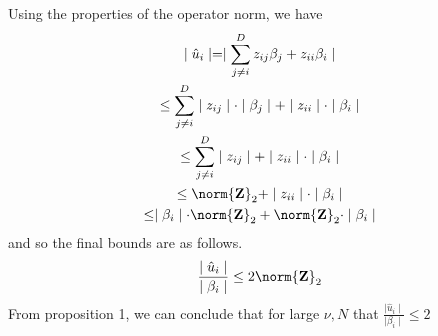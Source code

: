             Using the properties of the operator norm, we have
            \begin{gather*}
                \mid \hat{u}_i \mid = \mid \sum_{j\neq i}^D z_{ij} \beta_j + z_{ii} \beta_i \mid \\
                \leq \sum_{j\neq i}^D \mid z_{ij}\mid \cdot  \mid \beta_j \mid + \mid z_{ii} \mid \cdot \mid \beta_i \mid \\
                \leq \sum_{j\neq i}^D \mid z_{ij}\mid + \mid z_{ii} \mid \cdot \mid \beta_i \mid \\
                \leq \norm{\mathbf{Z}}_2 + \mid z_{ii} \mid \cdot \mid \beta_i \mid \\
                \leq \mid \beta_i\mid \cdot \norm{\mathbf{Z}}_2 + \norm{\mathbf{Z}}_2 \cdot \mid \beta_i \mid
            \end{gather*}
            and so the final bounds are as follows.
            \begin{equation*}
                \frac{\mid \hat{u}_i\mid}{\mid \beta_i \mid} \leq 2\norm{\mathbf{Z}}_2
            \end{equation*}
            From proposition 1, we can conclude that for large $\nu, N$ that $\frac{\mid \hat{u}_i\mid}{\mid \beta _i \mid} \leq 2$
            

 